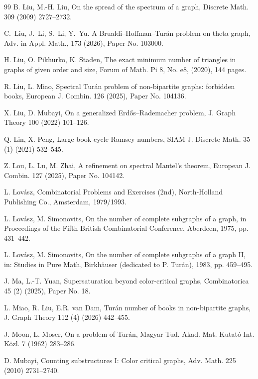 \documentclass[11pt,a4paper]{article}
\theoremstyle{definition}
\theoremstyle{plain}
\begin{document}
\begin{thebibliography}{99}
B. Liu, M.-H. Liu, 
On the spread of the spectrum of a graph,  Discrete Math. 309 (2009) 2727--2732. 

C.~Liu, J.~Li, S.~Li, Y.~Yu.
A {Brualdi--Hoffman--Tur\'{a}n} problem on theta graph, {Adv. in Appl. Math.}, 173 (2026), 
Paper No. 103000. 

H. Liu, O. Pikhurko, K. Staden, 
The exact minimum number of triangles in graphs of given order and size, 
Forum of Math. Pi 8, No. e8, (2020), 144 pages. 

R. Liu, L. Miao, Spectral Tur\'{a}n problem of non-bipartite graphs: forbidden books, 
European J. Combin. 126 (2025), Paper No. 104136. 

X. Liu, D. Mubayi, 
On a generalized Erd\H{o}s--Rademacher problem, 
J. Graph Theory 100 (2022) 101--126. 

Q. Lin, X. Peng, Large book-cycle Ramsey numbers, 
SIAM J. Discrete Math. 35 (1) (2021) 532--545.

Z. Lou, L. Lu, M. Zhai, 
A refinement on spectral Mantel's theorem,  European J. Combin. 127 (2025), Paper No. 104142. 

L. Lov\'{a}sz, 
Combinatorial Problems and Exercises (2nd), 
North-Holland Publishing Co., Amsterdam, 1979/1993. 

L. Lov\'asz, M. Simonovits,
On the number of complete subgraphs of a graph, in {Proceedings of the Fifth British Combinatorial Conference},
Aberdeen, 1975, pp. 431--442.

L. Lov\'{a}sz, M. Simonovits,
On the number of complete subgraphs of a graph II,
in: Studies in Pure Math, Birkh\"{a}user (dedicated to P. Tur\'{a}n), 1983,
pp. 459--495.

J. Ma, L.-T. Yuan, 
Supersaturation beyond color-critical graphs, 
Combinatorica 45 (2) (2025), Paper No. 18. 

L. Miao, R. Liu, E.R. van Dam, 
Turán number of books in non-bipartite graphs, 
J. Graph Theory 112 (4) (2026) 442--455.

J. Moon, L. Moser, On a problem of Tur\'{a}n, Magyar Tud. Akad. Mat. Kutat\'{o} Int. K\"{o}zl.
7 (1962) 283--286.

D. Mubayi,
Counting substructures I: Color critical graphs,
Adv. Math. 225 (2010) 2731--2740.


\end{thebibliography}
\end{document}
